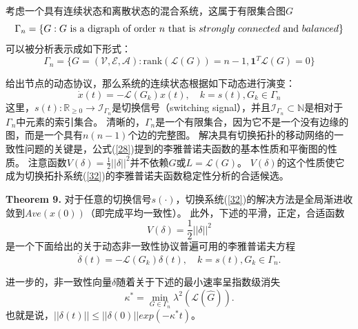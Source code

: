 \documentclass{article}
\begin{document}
考虑一个具有连续状态和离散状态的混合系统，这属于有限集合图$G$
\begin{equation}
    \Gamma_n = \{ G: G\ \text{is a digraph of order}\ n\ \text{that is}\ strongly\ connected\ \text{and}\ balanced \}
    \notag
\end{equation}
可以被分析表示成如下形式：
\begin{equation}
    \Gamma_n = \{ G=(\mathcal{V}, \mathcal{E}, \mathcal{A}): \text{rank}(\mathcal{L}(G)) =n-1, \mathbf{1}^T\mathcal{L}(G) = 0\}
    \tag{31}
    \label{31}
\end{equation}

给出节点的动态协议，那么系统的连续状态根据如下动态进行演变：
\begin{equation}
    \dot{x}(t) = -\mathcal{L}(G_k)x(t),\quad k=s(t), G_k\in \Gamma_n
    \tag{32}
    \label{32}
\end{equation}
这里，$s(t): \mathbb{R}_{\ge 0}\rightarrow \mathcal{I}_{\Gamma_n}$是切换信号（switching signal），并且$\mathcal{I}_{\Gamma_n}\subset \mathbb{N}$是相对于$\Gamma_n$中元素的索引集合。
清晰的，$\Gamma_n$是一个有限集合，因为它不是一个没有边缘的图，而是一个具有$n(n-1)$个边的完整图。
解决具有切换拓扑的移动网络的一致性问题的关键是，公式(\ref{28})提到的李雅普诺夫函数的基本性质和平衡图的性质。
注意函数$V(\delta)=\frac{1}{2}||\delta||^2$并不依赖$G$或$L=\mathcal{L}(G)$。
$V(\delta)$的这个性质使它成为切换拓扑系统(\ref{32})的李雅普诺夫函数稳定性分析的合适候选。

\noindent \textbf{Theorem 9.} 对于任意的切换信号$s(\cdot)$，切换系统(\ref{32})的解决方法是全局渐进收敛到$Ave(x(0))$（即完成平均一致性）。
此外，下述的平滑，正定，合适函数
\begin{equation}
    V(\delta) = \frac{1}{2}||\delta||^2
    \label{33}
    \tag{33}
\end{equation}
是一个下面给出的关于动态非一致性协议普遍可用的李雅普诺夫方程
\begin{equation}
    \dot{\delta}(t) = -\mathcal{L}(G_k)\delta(t),\quad k=s(t),G_k\in \Gamma_n.
    \tag{34}
    \label{34}
\end{equation}

进一步的，非一致性向量$\delta$随着关于下述的最小速率呈指数级消失
\begin{equation}
    \kappa^* = \min_{G\in \Gamma_n} \lambda^2(\mathcal{L}(\hat{G})).
    \tag{35}
    \label{35}
\end{equation}
也就是说，$||\delta(t)||\le ||\delta(0)||exp(-\kappa^*t)$。
\end{document}
